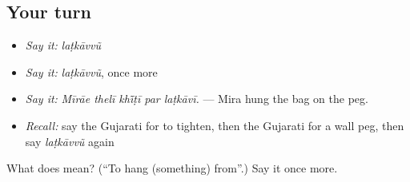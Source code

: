 \subsection*{Your turn}
\begin{itemize}
\raggedright
  \item \emph{Say it:} \emph{laṭkāvvũ}
  \item \emph{Say it:} \emph{laṭkāvvũ}, once more
  \item \emph{Say it:} \emph{Mīrāe thelī khī̃ṭī par laṭkāvī.} — Mira hung the bag on the peg.
  \item \emph{Recall:} say the Gujarati for to tighten, then the Gujarati for a wall peg, then say \emph{laṭkāvvũ} again
\end{itemize}

\begin{tcolorbox}[breakable,colback=teal!4,colframe=teal!35!black,title={Before you move on}]
What does  mean? (\textquotedblleft{}To hang (something) from\textquotedblright{}.) Say it once more.
\end{tcolorbox}
